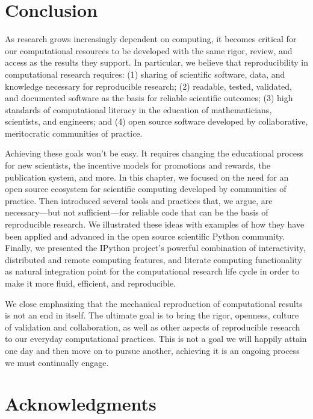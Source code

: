\documentclass[ChapterTOCs,krantz2]{krantz} %
\begin{document}
\section{Conclusion}\label{conclusion}

As research grows increasingly dependent on computing, it becomes critical for
our computational resources to be developed with the same rigor, review,
and access as the results they support. In particular, we believe that
reproducibility in computational research requires: (1) sharing of scientific
software, data, and knowledge necessary for reproducible research; (2)
readable, tested, validated, and documented software as the basis for reliable
scientific outcomes; (3) high standards of computational literacy in the
education of mathematicians, scientists, and engineers; and (4) open source
software developed by collaborative, meritocratic communities of practice.

Achieving these goals won't be easy.  It requires changing the educational
process for new scientists, the incentive models for promotions and rewards,
the publication system, and more. In this chapter, we focused on the need for
an open source ecosystem for scientific computing developed by communities of
practice.  Then introduced several tools and practices that, we argue, are
necessary---but not sufficient---for reliable code that can be the basis of
reproducible research.  We illustrated these ideas with examples of how they
have been applied and advanced in the open source scientific Python community.
Finally, we presented the IPython project's powerful combination of
interactivity, distributed and remote computing features, and literate
computing functionality as natural integration point for the computational
research life cycle in order to make it more fluid, efficient, and
reproducible.

We close emphasizing that the mechanical reproduction of computational results
is not an end in itself.  The ultimate goal is to bring the rigor, openness,
culture of validation and collaboration, as well as other aspects of
reproducible research to our everyday computational practices. This is not a
goal we will happily attain one day and then move on to pursue another,
achieving it is an ongoing process we must continually engage.

\section*{Acknowledgments}
\end{document}
